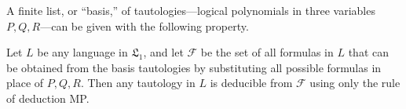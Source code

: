 A finite list, or ``basis,'' of tautologies---logical polynomials in three variables $P, Q, R$---can be given with the following property.

Let $L$ be any language in $\mathfrak{L}_1$, and let $\mathcal{F}$ be the set of all formulas in $L$ that can be obtained from the basis tautologies by substituting all possible formulas in place of $P, Q, R$. Then any tautology in $L$ is deducible from $\mathcal{F}$ using only the rule of deduction MP.
